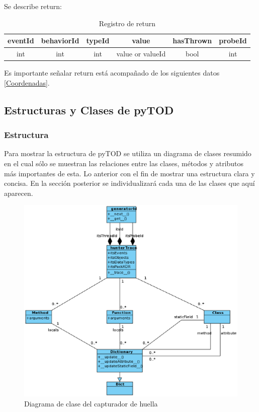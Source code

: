 \documentclass[12pt,legalpaper]{report}
\begin{document}
Se describe return:\\

\begin{table}[!h]
\begin{center}
\begin{tabular}{| c | c | c | c | c | c |}
\hline
\rowcolor[gray]{0.9}eventId & behaviorId & typeId & value & hasThrown & probeId \\
\hline
int & int & int & value or valueId\footnotemark[1] & bool & int\\
\hline
\end{tabular}
\caption{Registro de return} 
\end{center}
\end{table}

Es importante señalar return está acompañado de los siguientes datos \ref{Coordenadas}.

		
		
		
		\subsection{Estructuras y Clases de pyTOD}
		
		
		  	\subsubsection{Estructura}

Para mostrar la estructura de pyTOD se utiliza un diagrama de clases resumido en el cual sólo se muestran las relaciones entre las clases, métodos y atributos más importantes de esta.  Lo anterior con el fin de mostrar una estructura clara y concisa.  En la sección posterior se individualizará cada una de las clases que aquí aparecen. 
			
\begin{figure}[!h]
	\centering
	\includegraphics[scale=0.6]{images/classModelHunterTrace.eps}
	\caption{Diagrama de clase del capturador de huella}
\end{figure}			
			
\end{document}
